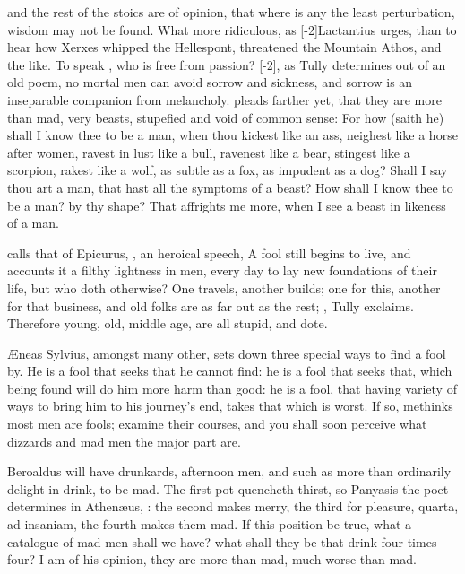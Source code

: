 \Seneca and the rest of the stoics are of opinion, that where is any the
least perturbation, wisdom may not be found. What more ridiculous, as
[-2\baselineskip]Lactantius urges, than to hear how Xerxes whipped the Hellespont,
threatened the Mountain Athos, and the like. To speak , who is
free from passion? [-2\baselineskip], as Tully determines out of an old poem, no mortal men
can avoid sorrow and sickness, and sorrow is an inseparable companion
from melancholy. \Chrysostom{} pleads farther yet, that they are more
than mad, very beasts, stupefied and void of common sense: For how
(saith he) shall I know thee to be a man, when thou kickest like an
ass, neighest like a horse after women, ravest in lust like a bull,
ravenest like a bear, stingest like a scorpion, rakest like a wolf, as
subtle as a fox, as impudent as a dog? Shall I say thou art a man, that
hast all the symptoms of a beast? How shall I know thee to be a man? by
thy shape? That affrights me more, when I see a beast in likeness of a
man.

\Seneca calls that of Epicurus, , an heroical
speech, A fool still begins to live, and accounts it a filthy lightness
in men, every day to lay new foundations of their life, but who doth
otherwise? One travels, another builds; one for this, another for that
business, and old folks are as far out as the rest; , Tully exclaims. Therefore young, old, middle age, are all
stupid, and dote.

\AE{}neas Sylvius, amongst many other, sets down three special ways
to find a fool by. He is a fool that seeks that he cannot find: he is a
fool that seeks that, which being found will do him more harm than
good: he is a fool, that having variety of ways to bring him to his
journey's end, takes that which is worst. If so, methinks most men are
fools; examine their courses, and you shall soon perceive what dizzards
and mad men the major part are.

Beroaldus will have drunkards, afternoon men, and such as more than
ordinarily delight in drink, to be mad. The first pot quencheth thirst,
so Panyasis the poet determines in Athen\ae{}us, : the second makes merry, the third for pleasure, quarta, ad
insaniam, the fourth makes them mad. If this position be true, what a
catalogue of mad men shall we have? what shall they be that drink four
times four?  I am of his opinion, they are more than mad, much worse
than mad.

